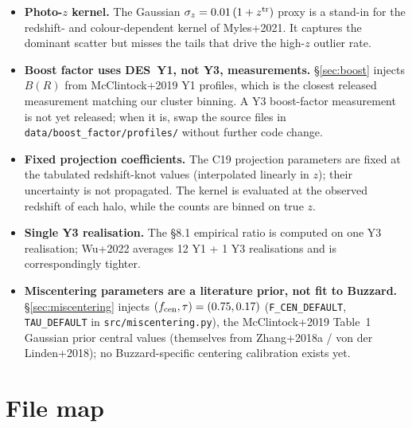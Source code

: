 \documentclass[a4paper, 11pt]{article}
\newcommand{\ztr}{z^{\rm tr}}
\newcommand{\pyfile}[1]{{\small\texttt{#1}}}
\begin{document}
\begin{itemize}
  \setlength\itemsep{2pt}
  \item \textbf{Photo-$z$ kernel.} The Gaussian
    $\sigma_z = 0.01\,(1+\ztr)$ proxy is a stand-in for the
    redshift- and colour-dependent kernel of Myles+2021. It captures
    the dominant scatter but misses the tails that drive the
    high-$z$ outlier rate.
  \item \textbf{Boost factor uses DES~Y1, not Y3, measurements.}
    \S\ref{sec:boost} injects $B(R)$ from McClintock+2019 Y1 profiles,
    which is the closest released measurement matching our cluster
    binning. A Y3 boost-factor measurement is not yet released; when
    it is, swap the source files in \pyfile{data/boost\_factor/profiles/}
    without further code change.
  \item \textbf{Fixed projection coefficients.} The C19 projection
    parameters are fixed at the tabulated redshift-knot values
    (interpolated linearly in $z$); their uncertainty is not propagated.
    The kernel is evaluated at the observed redshift of each halo, while
    the counts are binned on true $z$.
  \item \textbf{Single Y3 realisation.} The §8.1 empirical ratio is
    computed on one Y3 realisation; Wu+2022 averages 12 Y1 + 1 Y3
    realisations and is correspondingly tighter.
  \item \textbf{Miscentering parameters are a literature prior, not fit
    to Buzzard.} \S\ref{sec:miscentering} injects $(f_{\rm cen}, \tau) =
    (0.75, 0.17)$ (\texttt{F\_CEN\_DEFAULT}, \texttt{TAU\_DEFAULT} in
    \pyfile{src/miscentering.py}), the McClintock+2019 Table~1 Gaussian
    prior central values (themselves from Zhang+2018a / von der Linden+2018);
    no Buzzard-specific centering calibration exists yet.
\end{itemize}

\section{File map}
\label{sec:files}
\end{document}
